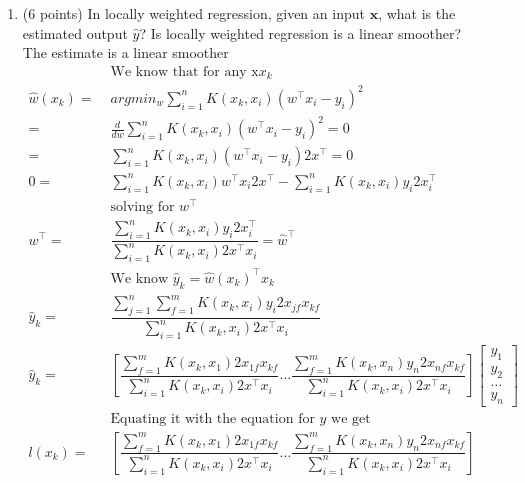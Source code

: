 \documentclass[english]{article}
\newcommand{\bx}{\mathbf{x}}
\begin{document}
\begin{enumerate}
\item (6 points) In locally weighted regression, given an input $\bx$,
  what is the estimated output $\hat{y}$?  Is locally weighted
  regression is a linear smoother? \\
The estimate is a linear smoother \\
\begin{align*}
	&\;\text{We know that for any x} x_k\\
	\hat{w}(x_k) =&\; argmin_w \sum\limits_{i=1}^n K(x_k,x_i) (w^\top x_i - y_i)^2 \\
	=&\; \frac{d}{dw} \sum\limits_{i=1}^n K(x_k,x_i) (w^\top x_i - y_i)^2 = 0 \\
	=&\;\sum\limits_{i=1}^n K(x_k,x_i) (w^\top x_i - y_i) 2x^\top = 0 \\
	0 =&\; \sum\limits_{i=1}^n K(x_k,x_i) w^\top x_i   2x^\top -  \sum\limits_{i=1}^n K(x_k,x_i) y_i 2x_i^\top \\
	&\;\text{solving for } w^\top \\
	w^\top =&\; \dfrac{\sum\limits_{i=1}^n K(x_k,x_i) y_i 2x_i^\top}
			     { \sum\limits_{i=1}^n K(x_k,x_i)  2x^\top x_i} = \hat{w}^{\top} \\
	&\;\text{We know } \hat{y}_k = \hat{w}(x_k)^\top x_k \\
	\hat{y}_k =&\; \dfrac{\sum\limits_{j=1}^n \sum\limits_{f = 1}^m  K(x_k,x_i) y_i 2x_{jf} x_{kf} }
				    {\sum\limits_{i=1}^n K(x_k,x_i)  2x^\top x_i  } \\ 
	\hat{y}_k =&\; \left[ \dfrac{\sum\limits_{f = 1}^m  K(x_k,x_1) 2x_{1f} x_{kf}} {\sum\limits_{i=1}^n K(x_k,x_i)   2x^\top x_i } \ldots   \dfrac{\sum\limits_{f = 1}^m  K(x_k,x_n) y_n 2x_{nf} x_{kf}} {\sum\limits_{i=1}^n K(x_k,x_i)   2x^\top x_i }           \right] \left[   \begin{array}{c}
				y_1\\
				y_2\\
				\ldots\\
				y_n
\end{array}	               \right] \\
	&\;\text{Equating it with the equation for } \hat{y} \text{ we get} \\
	l(x_k) =&\;  \left[ \dfrac{\sum\limits_{f = 1}^m  K(x_k,x_1) 2x_{1f} x_{kf}} {\sum\limits_{i=1}^n K(x_k,x_i)  2x^\top  x_i } \ldots   \dfrac{\sum\limits_{f = 1}^m  K(x_k,x_n) y_n 2x_{nf} x_{kf}} {\sum\limits_{i=1}^n K(x_k,x_i)  2x^\top x_i }           \right]&\; 
\end{align*}




\end{enumerate}
\end{document}
